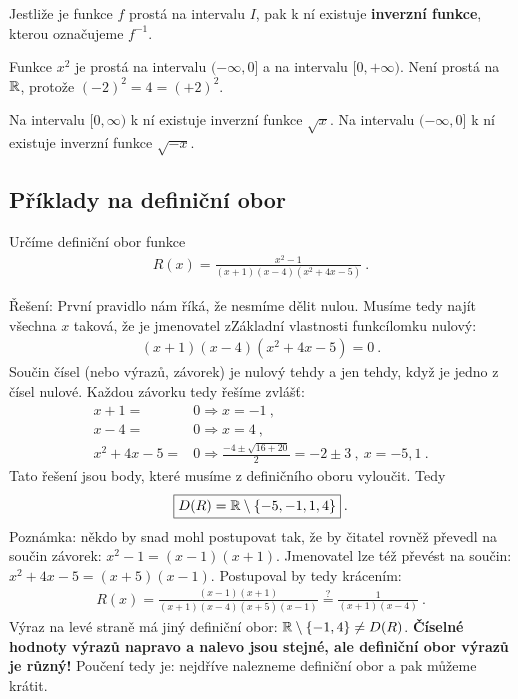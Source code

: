 Jestliže je funkce $f$ prostá na intervalu $I$, pak k ní existuje \textbf{inverzní funkce}, kterou označujeme $f^{-1}$.

\begin{example}
    Funkce $x^2$ je prostá na intervalu $(-\infty, 0]$ a na intervalu $[0,+\infty)$. Není prostá na $\mathbb{R}$, protože $(-2)^2 = 4 = (+2)^2$.

    Na intervalu $[0,\infty)$ k ní existuje inverzní funkce $\sqrt{x}$. Na intervalu $(-\infty,0]$ k ní existuje inverzní funkce $\sqrt{-x}$.
\end{example}



\subsection{Příklady na definiční obor}

\begin{example}
    Určíme definiční obor funkce \begin{align*}
        R(x) = \frac{x^2-1}{(x+1)(x-4)(x^2 + 4x - 5)} \:.
    \end{align*}

    Řešení: První pravidlo nám říká, že nesmíme dělit nulou. Musíme tedy najít všechna $x$ taková, že je jmenovatel zZákladní vlastnosti funkcílomku nulový: \begin{align*}
        (x+1)(x-4)(x^2 + 4x - 5) = 0 \:.
    \end{align*}
    Součin čísel (nebo výrazů, závorek) je nulový tehdy a jen tehdy, když je jedno z čísel nulové. Každou závorku tedy řešíme zvlášť:
    \begin{align*}
        x+1 =& 0 \Longrightarrow x = -1 \:, \\
        x-4 =& 0 \Longrightarrow x = 4 \:, \\
        x^2 + 4x - 5 =& 0 \Longrightarrow \frac{-4 \pm \sqrt{16+20}}{2} = - 2 \pm 3 \:, \: x = -5, 1 \:.
    \end{align*}
    Tato řešení jsou body, které musíme z definičního oboru vyloučit. Tedy \begin{align*}
        \boxed{D(R) = \mathbb{R} \setminus \left \lbrace -5,-1,1,4 \right \rbrace }\:.
    \end{align*}
    Poznámka: někdo by snad mohl postupovat tak, že by čitatel rovněž převedl na součin závorek: $x^2-1 = (x-1)(x+1)$. Jmenovatel lze též převést na součin: $x^2+4x-5 = (x+5)(x-1)$. Postupoval by tedy krácením:
    \begin{align*}
        R(x) = \frac{(x-1)(x+1)}{(x+1)(x-4)(x+5)(x-1)} \overset{?}{=} \frac{1}{(x+1)(x-4)} \:.
    \end{align*}
    Výraz na levé straně má jiný definiční obor: $\mathbb{R} \setminus \left \lbrace -1,4 \right \rbrace \neq D(R)$.
    \textbf{Číselné hodnoty výrazů napravo a nalevo jsou stejné, ale definiční obor výrazů je různý!} Poučení tedy je: nejdříve nalezneme definiční obor a pak můžeme krátit.
\end{example}

